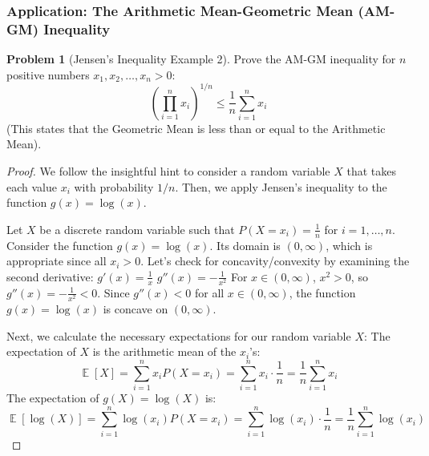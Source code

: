 \documentclass[11pt, letterpaper]{article}
\theoremstyle{plain} %
\theoremstyle{definition} %
\newtheorem{problem}{Problem}[section] %
\theoremstyle{remark} %
\DeclareMathOperator{\E}{\mathbb{E}}
\begin{document}
\subsubsection{Application: The Arithmetic Mean-Geometric Mean (AM-GM) Inequality}
\begin{problem}[Jensen's Inequality Example 2]
\label{prob:jensen_amgm}
Prove the AM-GM inequality for $n$ positive numbers $x_1, x_2, \dots, x_n > 0$:
\[ \left(\prod_{i=1}^n x_i\right)^{1/n} \le \frac{1}{n}\sum_{i=1}^n x_i \]
(This states that the Geometric Mean is less than or equal to the Arithmetic Mean).
\end{problem}
\begin{proof}
We follow the insightful hint to consider a random variable $X$ that takes each value $x_i$ with probability $1/n$. Then, we apply Jensen's inequality to the function $g(x) = \log(x)$.

Let $X$ be a discrete random variable such that $P(X=x_i) = \frac{1}{n}$ for $i=1, \dots, n$.
Consider the function $g(x) = \log(x)$. Its domain is $(0, \infty)$, which is appropriate since all $x_i > 0$.
Let's check for concavity/convexity by examining the second derivative:
$g'(x) = \frac{1}{x}$
$g''(x) = -\frac{1}{x^2}$
For $x \in (0, \infty)$, $x^2 > 0$, so $g''(x) = -\frac{1}{x^2} < 0$.
Since $g''(x) < 0$ for all $x \in (0, \infty)$, the function $g(x) = \log(x)$ is concave on $(0, \infty)$.

Next, we calculate the necessary expectations for our random variable $X$:
The expectation of $X$ is the arithmetic mean of the $x_i$'s:
\[ \E[X] = \sum_{i=1}^n x_i P(X=x_i) = \sum_{i=1}^n x_i \cdot \frac{1}{n} = \frac{1}{n}\sum_{i=1}^n x_i \]
The expectation of $g(X) = \log(X)$ is:
\[ \E[\log(X)] = \sum_{i=1}^n \log(x_i) P(X=x_i) = \sum_{i=1}^n \log(x_i) \cdot \frac{1}{n} = \frac{1}{n}\sum_{i=1}^n \log(x_i) \]


\end{proof}
\end{document}
